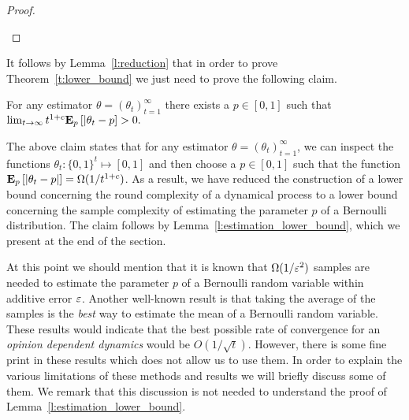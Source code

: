 \begin{proof}
\begin{figure}
    \vspace{-15mm}
    \label{fig:lb_instance}
  \end{figure}
\end{proof}
%
It follows by Lemma~\ref{l:reduction} that in order to prove Theorem~\ref{t:lower_bound} we
just need to prove the following claim.
\begin{claim}\label{cl:fixed_p}
  For any estimator $\theta = (\theta_t)_{t=1}^\infty$
  there exists a $p \in [0,1]$ such that
  \(
    \lim_{t \to \infty} t^{1+c} \bm{\mathrm{E}}_{p} \left[ |\theta_t - p \right] > 0.
  \)
\end{claim}
The above claim states that for any estimator $\theta=(\theta_t)_{t=1}^\infty$,
we can inspect the functions $\theta_t: \{0,1\}^t \mapsto [0,1]$ and then choose
a $p \in [0,1]$ such that the function $\bm{\mathrm{E}}_{p} \left[ |\theta_t-p| \right]= \Omega(1/t^{1+c})$. As
a result, we have reduced the construction of a lower bound concerning the round
complexity of a dynamical process to a lower bound concerning the sample complexity of
estimating the parameter $p$ of a Bernoulli distribution. The claim follows by
Lemma~\ref{l:estimation_lower_bound}, which we present at the end of the section.

At this point we should mention that it is known
that $\Omega(1/\varepsilon^2)$ samples are needed to estimate the parameter $p$
of a Bernoulli random variable within additive error $\varepsilon$.
Another well-known result is that taking the average of the samples
is the \emph{best} way to estimate the mean of a Bernoulli random variable.
These results would indicate that the best possible rate of convergence
for an \emph{opinion dependent dynamics} would be $O(1/\sqrt{t})$.
However, there is some fine print in these results which does not allow us
to use them. In order to explain the various limitations of
these methods and results we will briefly discuss some of them.
We remark that this discussion is not needed to understand the proof of
Lemma~\ref{l:estimation_lower_bound}.

